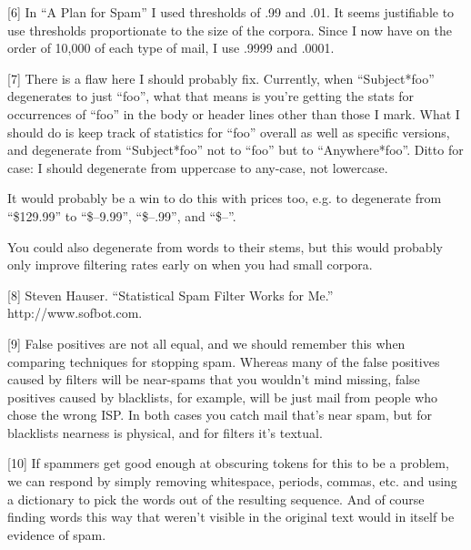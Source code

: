 [6] In ``A Plan for Spam'' I used
                  thresholds of .99 and .01. It seems justifiable to use
                  thresholds proportionate to the size of the corpora. Since I
                  now have on the order of 10,000 of each type of mail, I use
                  .9999 and .0001.

[7] There is a flaw here I should
                  probably fix. Currently, when ``Subject*foo'' degenerates to
                  just ``foo'', what that means is you're getting the stats for
                  occurrences of ``foo'' in the body or header lines other than
                  those I mark. What I should do is keep track of statistics for
                  ``foo'' overall as well as specific versions, and degenerate
                  from ``Subject*foo'' not to ``foo'' but to ``Anywhere*foo''.
                  Ditto for case: I should degenerate from uppercase to
                  any-case, not lowercase.

It would probably be a win
                  to do this with prices too, e.g. to degenerate from
                  ``\$129.99'' to ``\$--9.99'', ``\$--.99'', and ``\$--''.

You
                  could also degenerate from words to their stems, but this
                  would probably only improve filtering rates early on when you
                  had small corpora.

[8] Steven Hauser. ``Statistical
                  Spam Filter Works for Me.'' http://www.sofbot.com.

[9]
                  False positives are not all equal, and we should remember this
                  when comparing techniques for stopping spam. Whereas many of
                  the false positives caused by filters will be near-spams that
                  you wouldn't mind missing, false positives caused by
                  blacklists, for example, will be just mail from people who
                  chose the wrong ISP. In both cases you catch mail that's near
                  spam, but for blacklists nearness is physical, and for filters
                  it's textual.
                  

[10] If spammers get good enough at
                  obscuring tokens for this to be a problem, we can respond by
                  simply removing whitespace, periods, commas, etc. and using a
                  dictionary to pick the words out of the resulting sequence.
                  And of course finding words this way that weren't visible in
                  the original text would in itself be evidence of spam.

